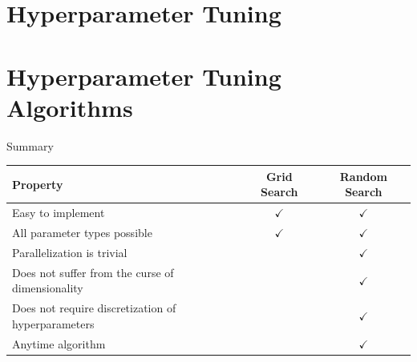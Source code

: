 \documentclass[11pt,compress,t,notes=noshow, xcolor=table]{beamer}
\date{}
\begin{document}


\section{Hyperparameter Tuning}



\section{Hyperparameter Tuning Algorithms}



\begin{frame}{Summary}
    \begin{table}[]
        \centering
        \begin{tabular}{l|cc}
            Property & Grid Search & Random Search \\
            \midrule
            Easy to implement & $\checkmark$ & $\checkmark$ \\
            All parameter types possible & $\checkmark$ & $\checkmark$ \\
            Parallelization is trivial & & $\checkmark$ \\
            Does not suffer from the curse of dimensionality & & $\checkmark$ \\
            Does not require discretization of hyperparameters & & $\checkmark$ \\
            Anytime algorithm & & $\checkmark$
        \end{tabular}
    \end{table}
\end{frame}





\endlecture
\end{document}
